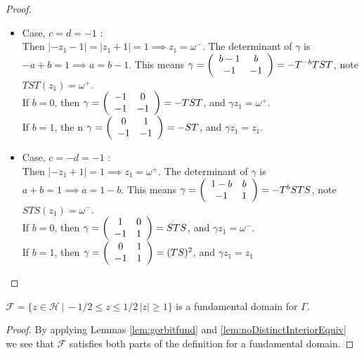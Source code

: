 \begin{proof}
\begin{enumerate}[(i)]
\begin{itemize}
\item Case, $c = d = -1$ : \\
Then $|-z_1 - 1| = |z_1 +1| = 1  \implies z_1 = \omega^-$. The determinant of $\gamma$ is $-a + b =1 \implies a = b-1$. This means $\gamma =  \left(\begin{array}{ c c } b-1 &  b \\ -1 & -1 \end{array} \right) = -T^{-b}TST$, note $TST(z_1) = \omega^+$. \\
If $b = 0$, then $\gamma = \left(\begin{array}{ c c } -1 &  0 \\ -1 & -1 \end{array} \right) = -TST$, and $\gamma z_1 = \omega^+$. \\
If $b = 1$, the n $\gamma =  \left(\begin{array}{ c c } 0 &  1 \\ -1 & -1 \end{array} \right) = -ST$, and $\gamma z_1 = z_1$.

\item Case, $c = -d = -1$ : \\
Then $|-z_1 + 1| =1 \implies z_1 = \omega^+$. The determinant of $\gamma$ is $a +b =1 \implies a = 1-b$. This means $\gamma =  \left(\begin{array}{ c c } 1-b &  b \\ -1 & 1 \end{array} \right) = -T^{b}STS$, note $ STS(z_1) = \omega^-$. \\
If $ b = 0$, then $\gamma = \left(\begin{array}{ c c } 1 &  0 \\ -1 & 1 \end{array} \right) = STS$, and $\gamma z_1 = \omega^-$.\\
If $ b = 1$, then $\gamma = \left(\begin{array}{ c c } 0 &  1 \\ -1 & 1 \end{array} \right) = (TS)^2$, and $\gamma z_1 = z_1$

\end{itemize}

\end{enumerate}
\end{proof}

\begin{proposition}\label{prop:fundamentalDomain}
$\mathcal{F} = \{z \in \mathcal{H} \, | \, -1/2 \leq z \leq 1/2 \, |z| \geq 1  \}$ is a fundamental domain for $\Gamma$.
\end{proposition}
\begin{proof}
By applying Lemmas \ref{lem:gorbitfund} and \ref{lem:noDistinctInteriorEquiv} we see that $\mathcal{F}$ satisfies both parts of the definition for a fundamental domain. 
\end{proof}

